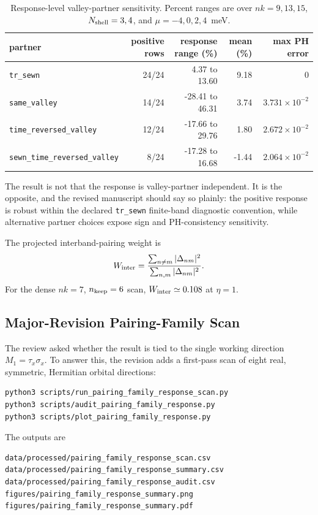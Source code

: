 \documentclass[aps,prb,preprint,superscriptaddress,floatfix,nofootinbib]{revtex4-2}
\newcommand{\code}[1]{\texttt{#1}}
\begin{document}
\begin{table}[t]
\caption{Response-level valley-partner sensitivity.  Percent ranges are over
$nk=9,13,15$, $N_{\rm shell}=3,4$, and $\mu=-4,0,2,4$~meV.}
\label{tab:sm_valley_response_sensitivity}
\small
\begin{ruledtabular}
\begin{tabular}{lrrrr}
partner & positive rows & response range (\%) & mean (\%) & max PH error\\
\hline
\code{tr\_sewn} & 24/24 & 4.37 to 13.60 & 9.18 & 0\\
\code{same\_valley} & 14/24 & -28.41 to 46.31 & 3.74 & $3.731\times10^{-2}$\\
\code{time\_reversed\_valley} & 12/24 & -17.66 to 29.76 & 1.80 & $2.672\times10^{-2}$\\
\code{sewn\_time\_reversed\_valley} & 8/24 & -17.28 to 16.68 & -1.44 & $2.064\times10^{-2}$\\
\end{tabular}
\end{ruledtabular}
\end{table}

The result is not that the response is valley-partner independent.  It is the
opposite, and the revised manuscript should say so plainly: the positive
response is robust within the declared \code{tr\_sewn} finite-band diagnostic
convention, while alternative partner choices expose sign and PH-consistency
sensitivity.

The projected interband-pairing weight is
\begin{equation}
  W_{\rm inter}
  =
  \frac{\sum_{n\ne m}|\Delta_{nm}|^2}
       {\sum_{n,m}|\Delta_{nm}|^2}.
\end{equation}
For the dense $nk=7$, $n_{\rm keep}=6$ scan, $W_{\rm inter}\simeq 0.108$ at
$\eta=1$.

\subsection{Major-Revision Pairing-Family Scan}

The review asked whether the result is tied to the single working direction
$M_1=\tau_x\sigma_x$.  To answer this, the revision adds a first-pass scan of
eight real, symmetric, Hermitian orbital directions:
\begin{verbatim}
python3 scripts/run_pairing_family_response_scan.py
python3 scripts/audit_pairing_family_response.py
python3 scripts/plot_pairing_family_response.py
\end{verbatim}
The outputs are
\begin{verbatim}
data/processed/pairing_family_response_scan.csv
data/processed/pairing_family_response_summary.csv
data/processed/pairing_family_response_audit.csv
figures/pairing_family_response_summary.png
figures/pairing_family_response_summary.pdf
\end{verbatim}
\end{document}
